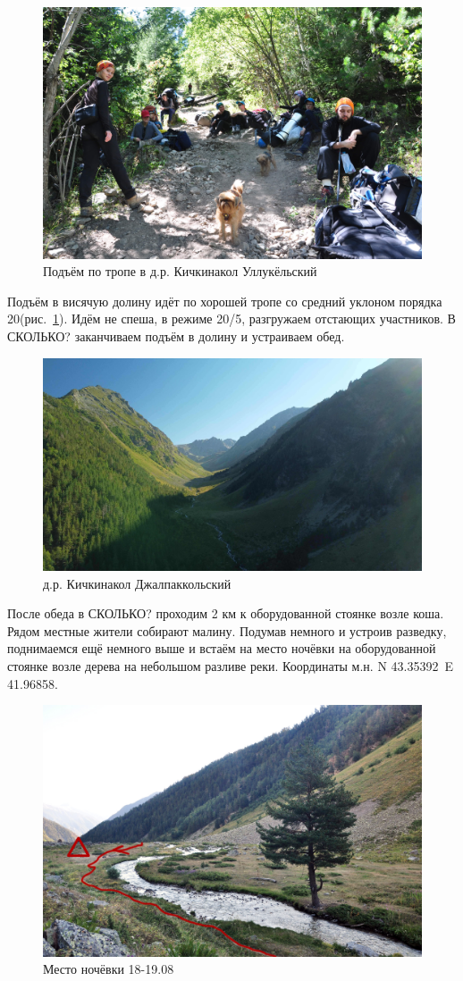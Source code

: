 \begin{figure}[h!]
	\centering
	\includegraphics[width=0.7\linewidth]{../pics/DSC_0436}
	\caption{Подъём по тропе в д.р. Кичкинакол Уллукёльский}
	\label{fig:DSC_0436}
\end{figure}

Подъём в висячую долину идёт по хорошей тропе со средний уклоном порядка 20\degree (рис.~\ref{fig:DSC_0436}). Идём не спеша, в режиме 20/5, разгружаем отстающих участников. В \alert{СКОЛЬКО?} заканчиваем подъём в долину и устраиваем обед.

\begin{figure}[h!]
	\centering
	\includegraphics[width=0.7\linewidth]{../pics/DJI_0805}
	\caption{д.р. Кичкинакол Джалпаккольский}
	\label{fig:kichkinakol}
\end{figure}

После обеда в \alert{СКОЛЬКО?} проходим 2 км к оборудованной стоянке возле коша. Рядом местные жители собирают малину. Подумав немного и устроив разведку, поднимаемся ещё немного выше и встаём на место ночёвки на оборудованной стоянке возле дерева на небольшом разливе реки. Координаты м.н. N 43.35392\degree~E 41.96858\degree.
\begin{figure}[h!]
	\centering
	\includegraphics[width=0.7\linewidth]{../pics/camp_18}
	\caption{Место ночёвки 18-19.08}
	\label{fig:camp_18}
\end{figure}


\newpage
